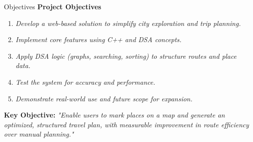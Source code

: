 \documentclass[aspectratio=169,10pt]{beamer}
\newcommand{\placeholder}[1]{\textit{\color{GEUGrey}#1}}
\begin{document}
\begin{frame}{Objectives}
\textbf{\color{GEUBlue}Project Objectives}
\vspace{1mm}
\begin{enumerate}\itemsep1pt
\item \placeholder{Develop a web-based solution to simplify city exploration and trip planning.}
\item \placeholder{Implement core features using C++ and DSA concepts.}
\item \placeholder{Apply DSA logic (graphs, searching, sorting) to structure routes and place data.}
\item \placeholder{Test the system for accuracy and performance.}
\item \placeholder{Demonstrate real-world use and future scope for expansion.}
\end{enumerate}
\vfill
\begin{center}
\colorbox{GEULightBlue}{\parbox{.80\textwidth}{\centering
\textbf{Key Objective:} \placeholder{"Enable users to mark places on a map and generate an optimized, structured travel plan, with measurable improvement in route efficiency over manual planning."}}}
\end{center}
\end{frame}
\end{document}
